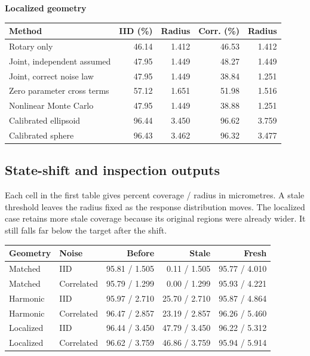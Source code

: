 \textbf{Localized geometry}

\begin{center}\small\begin{tabular}{@{}lrrrr@{}}\toprule
Method & IID (\%) & Radius & Corr. (\%) & Radius\\\midrule
Rotary only & 46.14 & 1.412 & 46.53 & 1.412\\
Joint, independent assumed & 47.95 & 1.449 & 48.27 & 1.449\\
Joint, correct noise law & 47.95 & 1.449 & 38.84 & 1.251\\
Zero parameter cross terms & 57.12 & 1.651 & 51.98 & 1.516\\
Nonlinear Monte Carlo & 47.95 & 1.449 & 38.88 & 1.251\\
Calibrated ellipsoid & 96.44 & 3.450 & 96.62 & 3.759\\
Calibrated sphere & 96.43 & 3.462 & 96.32 & 3.477\\
\bottomrule\end{tabular}\end{center}

\clearpage\subsection{State-shift and inspection outputs}Each cell in the first table gives percent coverage / radius in micrometres. A stale threshold leaves the radius fixed as the response distribution moves. The localized case retains more stale coverage because its original regions were already wider. It still falls far below the target after the shift.

\begin{center}\small\begin{tabular}{@{}llrrr@{}}\toprule
Geometry & Noise & Before & Stale & Fresh\\\midrule
Matched & IID & 95.81 / 1.505 & 0.11 / 1.505 & 95.77 / 4.010\\
Matched & Correlated & 95.79 / 1.299 & 0.00 / 1.299 & 95.93 / 4.221\\
Harmonic & IID & 95.97 / 2.710 & 25.70 / 2.710 & 95.87 / 4.864\\
Harmonic & Correlated & 96.47 / 2.857 & 23.19 / 2.857 & 96.26 / 5.460\\
Localized & IID & 96.44 / 3.450 & 47.79 / 3.450 & 96.22 / 5.312\\
Localized & Correlated & 96.62 / 3.759 & 46.86 / 3.759 & 95.94 / 5.914\\
\bottomrule\end{tabular}\end{center}

